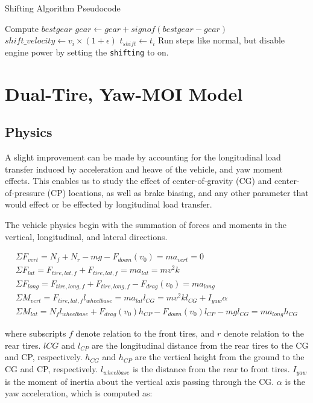 \documentclass{article}
\begin{document}
\begin{algorithm}[H]
\caption{Shifting Algorithm Pseudocode}
\begin{algorithmic}[1]
	\State Compute $bestgear$
	\State $gear \gets gear + signof(bestgear - gear)$
	\State $shift\_velocity \gets v_i \times (1 + \epsilon)$
	\State $t_{shift} \gets t_i$
	\State Run steps like normal, but disable engine power by setting the \texttt{shifting} to on.
	\EndWhile
	\EndIf
\end{algorithmic}
\end{algorithm}

\section{Dual-Tire, Yaw-MOI Model}

\subsection{Physics}

A slight improvement can be made by accounting for the longitudinal load transfer induced by acceleration and heave of the vehicle, and yaw moment effects. This enables us to study the effect of center-of-gravity (CG) and center-of-pressure (CP) locations, as well as brake biasing, and any other parameter that would effect or be effected by longitudinal load transfer.

The vehicle physics begin with the summation of forces and moments in the vertical, longitudinal, and lateral directions.

\begin{align}
	\Sigma F_{vert} = N_{f} + N_{r} - m g - F_{down}(v_0) = m a_{vert} = 0 \\
	\Sigma F_{lat}  = F_{tire,lat,f} + F_{tire,lat,f} = m a_{lat} = m v^2 k \\
	\Sigma F_{long} = F_{tire,long,f} + F_{tire,long,f} - F_{drag}(v_0) = m a_{long} \\	
	\Sigma M_{vert} = F_{tire,lat,f} l_{wheelbase} = m a_{lat} l_{CG} = m v^2 k l_{CG} + I_{yaw} \alpha \\
	\Sigma M_{lat}  = N_{f} l_{wheelbase} + F_{drag}(v_0) h_{CP} - F_{down}(v_0) l_{CP} - m g l_{CG} = m a_{long} h_{CG}
\end{align}

where subscripts $f$ denote relation to the front tires, and $r$ denote relation to the rear tires. $l{CG}$ and $l_{CP}$ are the longitudinal distance from the rear tires to the CG and CP, respectively. $h_{CG}$ and $h_{CP}$ are the vertical height from the ground to the CG and CP, respectively. $l_{wheelbase}$ is the distance from the rear to front tires. $I_{yaw}$ is the moment of inertia about the vertical axis passing through the CG. $\alpha$ is the yaw acceleration, which is computed as:
\end{document}
